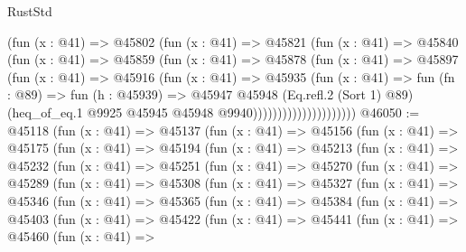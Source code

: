 \begin{lexlean}{RustStd}
\begin{coremodule}
                          (fun (x : @41) =>
                          @45802
                            (fun (x : @41) =>
                            @45821
                              (fun (x : @41) =>
                              @45840
                                (fun (x : @41) =>
                                @45859
                                  (fun (x : @41) =>
                                  @45878
                                    (fun (x : @41) =>
                                    @45897
                                      (fun (x : @41) =>
                                      @45916
                                        (fun (x : @41) =>
                                        @45935
                                          (fun (x : @41) =>
                                          fun (fn : @89) =>
                                          fun (h : @45939) =>
                                          @45947
                                            @45948
                                            (Eq.refl.{2} (Sort 1) @89)
                                            (heq_of_eq.{1}
                                              @9925
                                              @45945
                                              @45948
                                              @9940)))))))))))))))))))))
@46050 := @45118
    (fun (x : @41) =>
    @45137
      (fun (x : @41) =>
      @45156
        (fun (x : @41) =>
        @45175
          (fun (x : @41) =>
          @45194
            (fun (x : @41) =>
            @45213
              (fun (x : @41) =>
              @45232
                (fun (x : @41) =>
                @45251
                  (fun (x : @41) =>
                  @45270
                    (fun (x : @41) =>
                    @45289
                      (fun (x : @41) =>
                      @45308
                        (fun (x : @41) =>
                        @45327
                          (fun (x : @41) =>
                          @45346
                            (fun (x : @41) =>
                            @45365
                              (fun (x : @41) =>
                              @45384
                                (fun (x : @41) =>
                                @45403
                                  (fun (x : @41) =>
                                  @45422
                                    (fun (x : @41) =>
                                    @45441
                                      (fun (x : @41) =>
                                      @45460
                                        (fun (x : @41) =>

\end{coremodule}
\end{lexlean}

